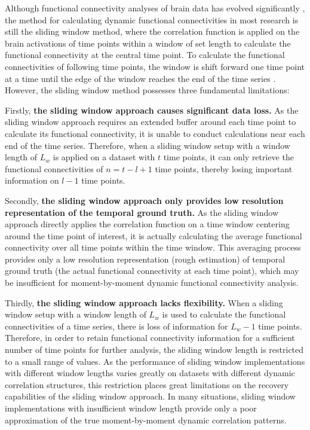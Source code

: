 \documentclass[11pt]{article}
\begin{document}
Although functional connectivity analyses of brain data has evolved significantly \citep{olaf2005,khambhati2017}, the method for calculating dynamic functional connectivities in most research is still the sliding window method, where the correlation function is applied on the brain activations of time points within a window of set length to calculate the functional connectivity at the central time point. To calculate the functional connectivities of following time points, the window is shift forward one time point at a time until the edge of the window reaches the end of the time series \citep{enrico2011,elena2012}. However, the sliding window method possesses three fundamental limitations:

Firstly, \textbf{the sliding window approach causes significant data loss.} As the sliding window approach requires an extended buffer around each time point to calculate its functional connectivity, it is unable to conduct calculations near each end of the time series. Therefore, when a sliding window setup with a window length of $L_w$ is applied on a dataset with $t$ time points, it can only retrieve the functional connectivities of $n=t-l+1$ time points, thereby losing important information on $l-1$ time points.

Secondly, \textbf{the sliding window approach only provides low resolution representation of the temporal ground truth.} As the sliding window approach directly applies the correlation function on a time window centering around the time point of interest, it is actually calculating the average functional connectivity over all time points within the time window. This averaging process provides only a low resolution representation (rough estimation) of temporal ground truth (the actual functional connectivity at each time point), which may be insufficient for moment-by-moment dynamic functional connectivity analysis.

Thirdly, \textbf{the sliding window approach lacks flexibility.} When a sliding window setup with a window length of $L_w$ is used to calculate the functional connectivities of a time series, there is loss of information for $L_w-1$ time points. Therefore, in order to retain functional connectivity information for a sufficient number of time points for further analysis, the sliding window length is restricted to a small range of values. As the performance of sliding window implementations with different window lengths varies greatly on datasets with different dynamic correlation structures, this restriction places great limitations on the recovery capabilities of the sliding window approach. In many situations, sliding window implementations with insufficient window length provide only a poor approximation of the true moment-by-moment dynamic correlation patterns.
\end{document}
